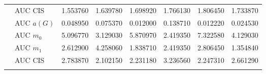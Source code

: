 \begin{table}[htbp]
\begin{tabular}{llrrrrrr}
    & AUC CIS & 1.553760 & 1.639780 & 1.698920 & 1.766130 & 1.806450 & 1.733870 \\
    \addlinespace
    \multirow{4}{*}{random} & AUC $a(G)$ & 0.048950 & 0.075370 & 0.012000 & 0.138710 & 0.012220 & 0.024530 \\
    & AUC $m_0$ & 5.096770 & 3.129030 & 5.870970 & 2.419350 & 7.322580 & 4.129030 \\
    & AUC $m_1$ & 2.612900 & 4.258060 & 1.838710 & 2.419350 & 2.806450 & 1.354840 \\
    & AUC CIS & 2.783870 & 2.102150 & 2.231180 & 3.236560 & 2.247310 & 2.661290 \\
    \addlinespace
    \bottomrule
  \end{tabular}
\end{table}

